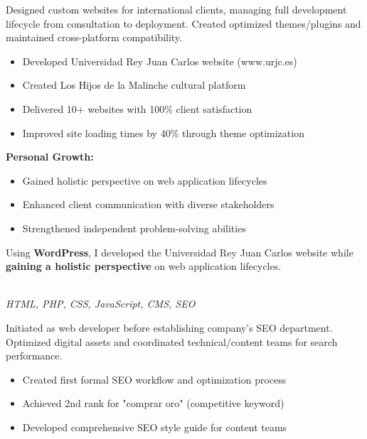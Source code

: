 \documentclass[a4paper,10pt]{article}
\newcommand{\experiencebreak}{\needspace{18\baselineskip}}
\begin{document}
Designed custom websites for international clients, managing full development lifecycle from consultation to deployment. Created optimized themes/plugins and maintained cross-platform compatibility.

\vspace{0.2cm}
\begin{itemize}[label=\textcolor{darkblue}{\textbullet}, leftmargin=*, nosep]
	\item Developed Universidad Rey Juan Carlos website (www.urjc.es)
	\item Created Los Hijos de la Malinche cultural platform
	\item Delivered 10+ websites with 100\% client satisfaction
	\item Improved site loading times by 40\% through theme optimization
\end{itemize}

\vspace{0.2cm}
\textbf{Personal Growth:}
\vspace{0.2cm}
\begin{itemize}[label=\textcolor{darkblue}{\textbullet}, leftmargin=*, nosep]
	\item Gained holistic perspective on web application lifecycles
	\item Enhanced client communication with diverse stakeholders
	\item Strengthened independent problem-solving abilities
\end{itemize}

\vspace{0.2cm}


Using \textbf{WordPress}, I developed the Universidad Rey Juan Carlos website
while \textbf{gaining a holistic perspective} on web application lifecycles.

\vspace{0.4cm}

\experiencebreak
\noindent\uline{} \\
\vspace{0.1cm} \hspace{0.2cm}
{\small\textit{HTML, PHP, CSS, JavaScript, CMS, SEO}}

Initiated as web developer before establishing company's SEO department. Optimized digital assets and coordinated technical/content teams for search performance.

\vspace{0.2cm}
\begin{itemize}[label=\textcolor{darkblue}{\textbullet}, leftmargin=*, nosep]
	\item Created first formal SEO workflow and optimization process
	\item Achieved 2nd rank for "comprar oro" (competitive keyword)
	\item Developed comprehensive SEO style guide for content teams
\end{itemize}
\end{document}
